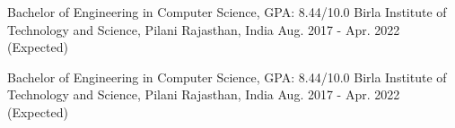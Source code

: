 
\begin{cventries}
  \cventry
    {Bachelor of Engineering in Computer Science, GPA: 8.44/10.0} %
    {Birla Institute of Technology and Science, Pilani } %
    {Rajasthan, India} %
    {Aug. 2017 - Apr. 2022 (Expected)} %
    {
      \begin{cvitems} %
      \end{cvitems}
    }
    
    \cventry
    {Bachelor of Engineering in Computer Science, GPA: 8.44/10.0} %
    {Birla Institute of Technology and Science, Pilani } %
    {Rajasthan, India} %
    {Aug. 2017 - Apr. 2022 (Expected)} %
    {
      \begin{cvitems} %
      \end{cvitems}
    }
\end{cventries}
